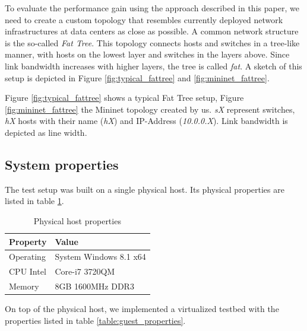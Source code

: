 To evaluate the performance gain using the approach described in this paper, we need to create a
custom topology that resembles currently deployed network infrastructures at data centers as close
as possible. A common network structure is the so-called \textit{Fat Tree}. \cite{datacenter} This
topology connects hosts and switches in a tree-like manner, with hosts on the lowest layer and
switches in the layers above. Since link bandwidth increases with higher layers, the tree is called
\textit{fat}. A sketch of this setup is depicted in Figure \ref{fig:typical_fattree} and
\ref{fig:mininet_fattree}.

Figure \ref{fig:typical_fattree} shows a typical Fat Tree setup, Figure \ref{fig:mininet_fattree}
the Mininet topology created by us. \textit{sX} represent switches, \textit{hX} hosts with their
name (\textit{hX}) and IP-Address (\textit{10.0.0.X}). Link bandwidth is depicted as line width.

\subsection{System properties}
The test setup was built on a single physical host. Its physical properties are listed in table
\ref{table:host_properties}.

\begin{table}[h]
    \centering
    \begin{tabular}{| l | l | }
        \hline
        \textbf{Property} & \textbf{Value} \\ \hline
        Operating &  System Windows 8.1 x64 \\ \hline
        CPU Intel & Core-i7 3720QM \\ \hline
        Memory & 8GB 1600MHz DDR3 \\ \hline
    \end{tabular}
    \caption{Physical host properties}
    \label{table:host_properties}
\end{table}

On top of the physical host, we implemented a virtualized testbed with the properties listed in
table \ref{table:guest_properties}.


